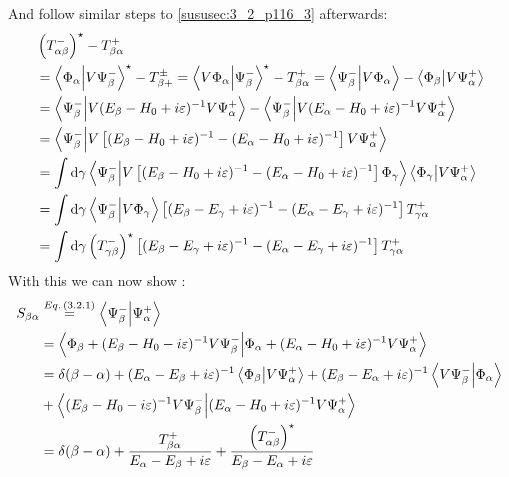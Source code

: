\begin{widetext}
	And follow similar steps to \ref{sususec:3_2_p116_3} afterwards:
	\begin{align}
		&\left(T_{\alpha\beta}^-\right)^\star-T_{\beta\alpha}^+\nonumber\\
		&=\braket{\Phi_\alpha}{V\Psi_\beta^-}^\star-T_{\beta+}^\pm
		=\braket{V\Phi_\alpha}{\Psi_\beta^-}^\star-T_{\beta\alpha}^+
		=\braket{\Psi_\beta^-}{V\Phi_\alpha}-\braket{\Phi_\beta}{V\Psi_\alpha^+}\nonumber\\
		&=\braket{\Psi_\beta^-}{V(E_\beta-H_0+ i \varepsilon)^{-1}V\Psi_\alpha^+}
		-\braket{\Psi_\beta^-}{V(E_\alpha-H_0+ i \varepsilon)^{-1}V\Psi_\alpha^+}\nonumber\\
		&=\braket{\Psi_\beta^-}{V\left[(E_\beta-H_0+ i \varepsilon)^{-1}-(E_\alpha-H_0+ i \varepsilon)^{-1}\right]V\Psi_\alpha^+}\nonumber\\
		&=\int\dd{\gamma}\braket{\Psi_\beta^-}{V\left[(E_\beta-H_0+ i \varepsilon)^{-1}-(E_\alpha-H_0+ i \varepsilon)^{-1}\right]\Phi_\gamma}
		\braket{\Phi_\gamma}{V\Psi_\alpha^+}\nonumber\\
		&=\int\dd{\gamma}\braket{\Psi_\beta^-}{V\Phi_\gamma}\left[(E_\beta-E_\gamma+ i \varepsilon)^{-1}-(E_\alpha-E_\gamma+ i \varepsilon)^{-1}\right]
		T_{\gamma\alpha}^+\nonumber\\
		&=\int\dd{\gamma}\left(T_{\gamma\beta}^-\right)^\star\left[(E_\beta-E_\gamma+ i \varepsilon)^{-1}-(E_\alpha-E_\gamma+ i \varepsilon)^{-1}\right]
		T_{\gamma\alpha}^+ \label{eq_3_B_1}
	\end{align}
	With this we can now show :
	\begin{align}
		S_{\beta\alpha}&\overset{\eq{3.2.1}}{=}\braket{\Psi_\beta^-}{\Psi_\alpha^+}\nonumber\\
		&=\braket{\Phi_\beta+(E_\beta-H_0- i \varepsilon)^{-1}V\Psi_\beta^-}{\Phi_\alpha+(E_\alpha-H_0+i \varepsilon)^{-1}V\Psi_\alpha^+}\nonumber\\
		&=\delta(\beta-\alpha) + (E_\alpha-E_\beta+i \varepsilon)^{-1} \braket{\Phi_\beta}{V\Psi_\alpha^+}
		+ (E_\beta-E_\alpha+i \varepsilon)^{-1} \braket{V\Psi_\beta^-}{\Phi_\alpha}\nonumber\\
		&+\braket{(E_\beta-H_0- i \varepsilon)^{-1}V\Psi_\beta^-}{(E_\alpha-H_0+i \varepsilon)^{-1}V\Psi_\alpha^+}\nonumber\\
		&=\delta(\beta-\alpha) + \dfrac{T_{\beta\alpha}^+}{E_\alpha-E_\beta+i \varepsilon} + \dfrac{\left(T_{\alpha\beta}^-\right)^\star}{E_\beta-E_\alpha+i \varepsilon}\nonumber\\

\end{align}
\end{widetext}
